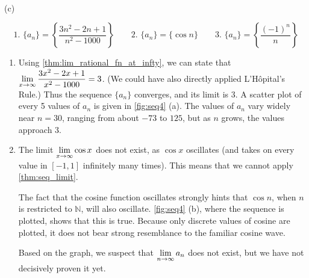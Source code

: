 \begin{example}
{
\\(c)}
%
\[
 \text{1. }\{a_n\} = \left\{\frac{3n^2-2n+1}{n^2-1000}\right\}\qquad
 \text{2. }\{a_n\} = \{\cos n \}\qquad
 \text{3. }\{a_n\} = \left\{\frac{(-1)^n}{n}\right\}
\]
\solution
\begin{enumerate}
\item		Using \autoref{thm:lim_rational_fn_at_infty}, we can state that $\displaystyle\lim_{x\to\infty} \frac{3x^2-2x+1}{x^2-1000} = 3$. (We could have also directly applied L'Hôpital's Rule.) Thus the sequence $\{a_n\}$ converges, and its limit is 3. A scatter plot of every 5 values of $a_n$ is given in \autoref{fig:seq4} (a). The values of $a_n$ vary widely near $n=30$, ranging from about $-73$ to $125$, but as $n$ grows, the values approach 3.

\item		The limit $\displaystyle\lim_{x\to\infty}\cos x$ does not exist, as $\cos x$ oscillates (and takes on every value in $[-1,1]$ infinitely many times). This means that we cannot apply \autoref{thm:seq_limit}. 

The fact that the cosine function oscillates strongly hints that $\cos n$, when $n$ is restricted to $\mathbb{N}$, will also oscillate. \autoref{fig:seq4} (b), where the sequence is plotted, shows that this is true. Because only discrete values of cosine are plotted, it does not bear strong resemblance to the familiar cosine wave.

Based on the graph, we suspect that $\displaystyle \lim_{n\to\infty} a_n$ does not exist, but we have not decisively proven it yet.



\end{enumerate}
\end{example}
